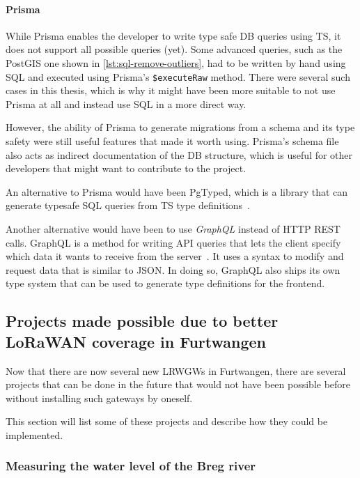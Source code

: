 \paragraph{Prisma}

While Prisma enables the developer to write type safe \ac{DB} queries using \ac{TS}, it does not support all possible queries (yet).
Some advanced queries, such as the PostGIS one shown in \cref{lst:sql-remove-outliers}, had to be written by hand using \ac{SQL} and executed using Prisma's \lstinline|$executeRaw| method.
There were several such cases in this thesis, which is why it might have been more suitable to not use Prisma at all and instead use \ac{SQL} in a more direct way.

However, the ability of Prisma to generate migrations from a schema and its type safety were still useful features that made it worth using.
Prisma's schema file also acts as indirect documentation of the \ac{DB} structure, which is useful for other developers that might want to contribute to the project.

An alternative to Prisma would have been PgTyped, which is a library that can generate typesafe \ac{SQL} queries from \ac{TS} type definitions~\cite{salakh_pgtyped_2023}.

Another alternative would have been to use \emph{GraphQL} instead of \ac{HTTP} \ac{REST} calls.
GraphQL is a method for writing \ac{API} queries that lets the client specify which data it wants to receive from the server~\cite{graphql_foundation_graphql_2023}.
It uses a syntax to modify and request data that is similar to \ac{JSON}.
In doing so, GraphQL also ships its own type system that can be used to generate type definitions for the frontend.

\subsection{Projects made possible due to better \acs{LoRaWAN} coverage in Furtwangen}

Now that there are now several new \aclp{LRWGW} in Furtwangen, there are several projects that can be done in the future that would not have been possible before without installing such gateways by oneself.

This section will list some of these projects and describe how they could be implemented.

\subsubsection{Measuring the water level of the Breg river}

